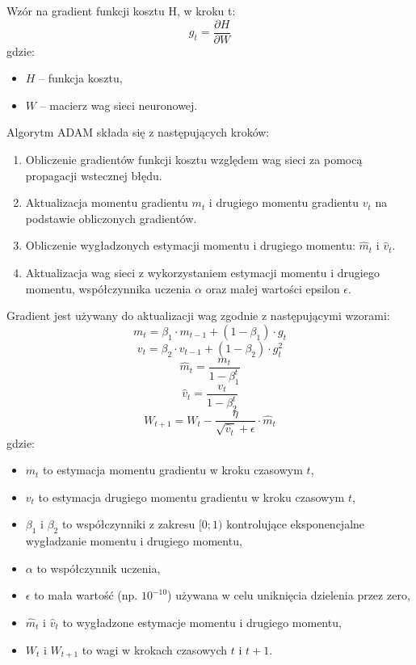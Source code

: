 \documentclass[a4paper]{article}
\begin{document}
Wzór na gradient funkcji kosztu H, w kroku t:
\[ g_t = \frac{\partial H}{\partial W} \]
gdzie:
\begin{itemize}
    \item \( H\) -- funkcja kosztu,
    \item \(W\) -- macierz wag sieci neuronowej.
\end{itemize}

Algorytm ADAM składa się z następujących kroków:
\begin{enumerate}
    \item Obliczenie gradientów funkcji kosztu względem wag sieci za pomocą propagacji wstecznej błędu.
    \item Aktualizacja momentu gradientu \(m_t\) i drugiego momentu gradientu \(v_t\) na podstawie obliczonych gradientów.
    \item Obliczenie wygładzonych estymacji momentu i drugiego momentu: \(\hat{m}_t\) i \(\hat{v}_t\).
    \item Aktualizacja wag sieci z wykorzystaniem estymacji momentu i drugiego momentu, współczynnika uczenia \(\alpha\) oraz małej wartości epsilon \(\epsilon\).
\end{enumerate}

Gradient jest używany do aktualizacji wag zgodnie z następującymi wzorami:
\[m_t = \beta_1 \cdot m_{t-1} + (1 - \beta_1) \cdot g_t\]
\[v_t = \beta_2 \cdot v_{t-1} + (1 - \beta_2) \cdot g_t^2\]
\[\hat{m}_t = \frac{m_t}{1 - \beta_1^t}\]
\[\hat{v}_t = \frac{v_t}{1 - \beta_2^t}\]
\[ W_{t+1} = W_t - \frac{\eta}{\sqrt{\hat{v}_t} + \epsilon} \cdot \hat{m}_t \]
gdzie:
\begin{itemize}
    \item \(m_t\) to estymacja momentu gradientu w kroku czasowym \(t\),
    \item \(v_t\) to estymacja drugiego momentu gradientu w kroku czasowym \(t\),
    \item \(\beta_1\) i \(\beta_2\) to współczynniki z zakresu \([0; 1)\) kontrolujące eksponencjalne wygładzanie momentu i drugiego momentu,
    \item \(\alpha\) to współczynnik uczenia,
    \item \(\epsilon\) to mała wartość (np. \(10^{-10}\)) używana w celu uniknięcia dzielenia przez zero,
    \item \(\hat{m}_t\) i \(\hat{v}_t\) to wygładzone estymacje momentu i drugiego momentu,
    \item \(W_{t}\) i \(W_{t+1}\) to wagi w krokach czasowych \(t\) i \(t+1\).
\end{itemize}
\end{document}
